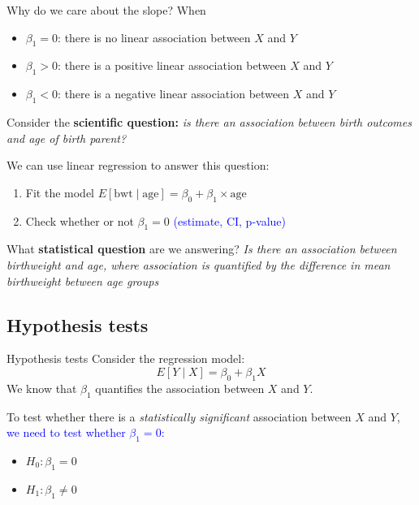 \documentclass[10pt,t]{beamer}
\begin{document}
\begin{frame}{Why do we care about the slope?}
When
\begin{itemize}
	\item $\beta_1 = 0$: there is no linear association between $X$ and $Y$
	\item $\beta_1 > 0$: there is a positive linear association between $X$ and $Y$
	\item $\beta_1 < 0$: there is a negative linear association between $X$ and $Y$
\end{itemize}

\vspace{0.3cm}

Consider the \textbf{scientific question:} \textit{is there an association between birth outcomes and age of birth parent?}

\vspace{0.3cm}

We can use linear regression to answer this question:

\begin{enumerate}
	\item Fit the model $E[\text{bwt} \mid \text{age}] = \beta_0 + \beta_1 \times \text{age}$
	\item Check whether or not $\beta_1 = 0$ \textcolor{blue}{(estimate, CI, p-value)}
\end{enumerate}

\vspace{0.3cm}

What \textbf{statistical question} are we answering? \textit{Is there an association between birthweight and age, where association is quantified by the difference in mean birthweight between age groups}

\end{frame}

\subsection{Hypothesis tests}

\begin{frame}{Hypothesis tests}
Consider the regression model:
$$
E[Y \mid X] = \beta_0 + \beta_1 X
$$
We know that $\beta_1$ quantifies the association between $X$ and $Y$.

\vspace{0.3cm}

To test whether there is a \textit{statistically significant} association between $X$ and $Y$, \textcolor{blue}{we need to test whether $\beta_1 = 0$:}

\begin{itemize}
	\item $H_0: \beta_1 = 0$
	\item $H_1: \beta_1 \neq 0$
\end{itemize}



\end{frame}
\end{document}
